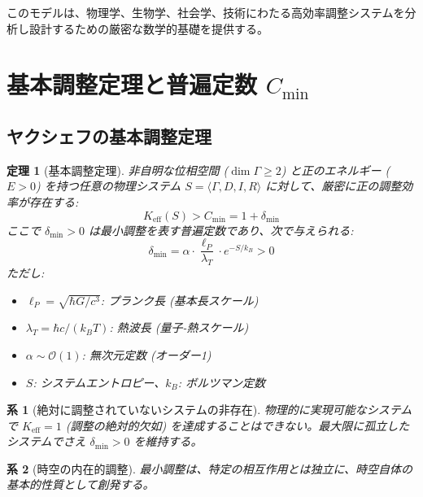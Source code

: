 \documentclass[11pt,a4paper]{article}
\newtheorem{theorem}{定理}
\newtheorem{corollary}{系}
\begin{document}
	このモデルは、物理学、生物学、社会学、技術にわたる高効率調整システムを分析し設計するための厳密な数学的基礎を提供する。
	
	\section{基本調整定理と普遍定数 \texorpdfstring{$C_{\min}$}{C\_min}}
	\label{sec:fundamental-theorem}
	
	\subsection{ヤクシェフの基本調整定理}
	
	\begin{theorem}[基本調整定理]
		非自明な位相空間 ($\dim\Gamma \geq 2$) と正のエネルギー ($E > 0$) を持つ任意の物理システム $S = \langle \Gamma, D, I, R \rangle$ に対して、厳密に正の調整効率が存在する:
		\begin{equation}
			\boxed{K_{\mathrm{eff}}(S) > C_{\min} = 1 + \delta_{\min}}
		\end{equation}
		ここで $\delta_{\min} > 0$ は最小調整を表す普遍定数であり、次で与えられる:
		\begin{equation}
			\delta_{\min} = \alpha \cdot \frac{\ell_P}{\lambda_T} \cdot e^{-S/k_B} > 0
		\end{equation}
		ただし:
		\begin{itemize}
			\item $\ell_P = \sqrt{\hbar G/c^3}$: プランク長 (基本長スケール)
			\item $\lambda_T = \hbar c/(k_B T)$: 熱波長 (量子-熱スケール)
			\item $\alpha \sim \mathcal{O}(1)$: 無次元定数 (オーダー1)
			\item $S$: システムエントロピー、$k_B$: ボルツマン定数
		\end{itemize}
	\end{theorem}
	
	\begin{corollary}[絶対に調整されていないシステムの非存在]
		物理的に実現可能なシステムで $K_{\mathrm{eff}} = 1$ (調整の絶対的欠如) を達成することはできない。最大限に孤立したシステムでさえ $\delta_{\min} > 0$ を維持する。
	\end{corollary}
	
	\begin{corollary}[時空の内在的調整]
		最小調整は、特定の相互作用とは独立に、時空自体の基本的性質として創発する。
	\end{corollary}
	
\end{document}
